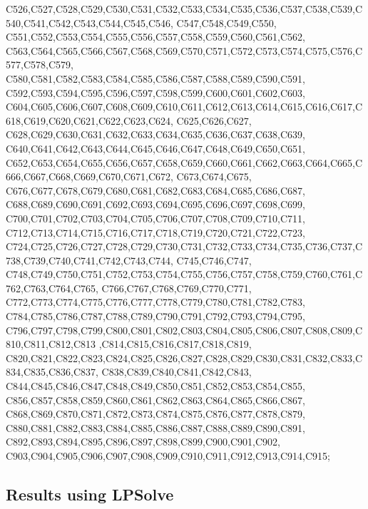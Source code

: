 C526,C527,C528,C529,C530,C531,C532,C533,C534,C535,C536,C537,C538,C539,C540,C541,C542,C543,C544,C545,C546, C547,C548,C549,C550,
C551,C552,C553,C554,C555,C556,C557,C558,C559,C560,C561,C562, C563,C564,C565,C566,C567,C568,C569,C570,C571,C572,C573,C574,C575,C576,C577,C578,C579,
C580,C581,C582,C583,C584,C585,C586,C587,C588,C589,C590,C591, C592,C593,C594,C595,C596,C597,C598,C599,C600,C601,C602,C603,
C604,C605,C606,C607,C608,C609,C610,C611,C612,C613,C614,C615,C616,C617,C618,C619,C620,C621,C622,C623,C624, C625,C626,C627,
C628,C629,C630,C631,C632,C633,C634,C635,C636,C637,C638,C639, C640,C641,C642,C643,C644,C645,C646,C647,C648,C649,C650,C651,
C652,C653,C654,C655,C656,C657,C658,C659,C660,C661,C662,C663,C664,C665,C666,C667,C668,C669,C670,C671,C672, C673,C674,C675,
C676,C677,C678,C679,C680,C681,C682,C683,C684,C685,C686,C687, C688,C689,C690,C691,C692,C693,C694,C695,C696,C697,C698,C699,
C700,C701,C702,C703,C704,C705,C706,C707,C708,C709,C710,C711, C712,C713,C714,C715,C716,C717,C718,C719,C720,C721,C722,C723,
C724,C725,C726,C727,C728,C729,C730,C731,C732,C733,C734,C735,C736,C737,C738,C739,C740,C741,C742,C743,C744, C745,C746,C747,
C748,C749,C750,C751,C752,C753,C754,C755,C756,C757,C758,C759,C760,C761,C762,C763,C764,C765, C766,C767,C768,C769,C770,C771,
C772,C773,C774,C775,C776,C777,C778,C779,C780,C781,C782,C783, C784,C785,C786,C787,C788,C789,C790,C791,C792,C793,C794,C795,
C796,C797,C798,C799,C800,C801,C802,C803,C804,C805,C806,C807,C808,C809,C810,C811,C812,C813 ,C814,C815,C816,C817,C818,C819,
C820,C821,C822,C823,C824,C825,C826,C827,C828,C829,C830,C831,C832,C833,C834,C835,C836,C837, C838,C839,C840,C841,C842,C843,
C844,C845,C846,C847,C848,C849,C850,C851,C852,C853,C854,C855, C856,C857,C858,C859,C860,C861,C862,C863,C864,C865,C866,C867,
C868,C869,C870,C871,C872,C873,C874,C875,C876,C877,C878,C879, C880,C881,C882,C883,C884,C885,C886,C887,C888,C889,C890,C891,
C892,C893,C894,C895,C896,C897,C898,C899,C900,C901,C902, C903,C904,C905,C906,C907,C908,C909,C910,C911,C912,C913,C914,C915;


\subsection{Results using LPSolve}

